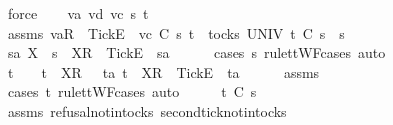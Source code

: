 \begin{isabellebody}
\ force\isanewline
{}\isamarkupfalse%
\isanewline
\ \ \isamarkupfalse%
\ va\ vd\ vc\ s{}{\isacharprime}\ t\isanewline
\ \ \isamarkupfalse%
\ assms{\isacharcolon}\ {\isachardoublequoteopen}{\isacharbrackleft}va{\isacharbrackright}\isactrlsub R\ {\isacharhash}\ {\isacharbrackleft}Tick{\isacharbrackright}\isactrlsub E\ {\isacharhash}\ vc\ {\isasymsubseteq}\isactrlsub C\ s{}{\isacharprime}{\isachardoublequoteclose}\ {\isachardoublequoteopen}t\ {\isasymin}\ tocks\ UNIV{\isachardoublequoteclose}\ {\isachardoublequoteopen}t\ {\isasymle}\isactrlsub C\ s{}{\isacharprime}\ {\isacharat}\ s{}{\isachardoublequoteclose}\isanewline
\ \ \isamarkupfalse%
\ \isamarkupfalse%
\ s{}{\isacharprime}a\ X\ \ {\isachardoublequoteopen}s{}{\isacharprime}\ {\isacharequal}\ {\isacharbrackleft}X{\isacharbrackright}\isactrlsub R\ {\isacharhash}\ {\isacharbrackleft}Tick{\isacharbrackright}\isactrlsub E\ {\isacharhash}\ s{}{\isacharprime}a{\isachardoublequoteclose}\isanewline
\ \ \ \ \isamarkupfalse%
\ {\isacharparenleft}cases\ s{}{\isacharprime}\ rule{\isacharcolon}ttWF{\isachardot}cases{\isacharcomma}\ auto{\isacharparenright}\isanewline
\ \ \isamarkupfalse%
\ \isamarkupfalse%
\ {\isachardoublequoteopen}t\ {\isacharequal}\ {\isacharbrackleft}{\isacharbrackright}\ {\isasymor}\ t\ {\isacharequal}\ {\isacharbrackleft}{\isacharbrackleft}X{\isacharbrackright}\isactrlsub R{\isacharbrackright}\ {\isasymor}\ {\isacharparenleft}{\isasymexists}\ ta{\isachardot}\ t\ {\isacharequal}\ {\isacharbrackleft}X{\isacharbrackright}\isactrlsub R\ {\isacharhash}\ {\isacharbrackleft}Tick{\isacharbrackright}\isactrlsub E\ {\isacharhash}\ ta{\isacharparenright}{\isachardoublequoteclose}\isanewline
\ \ \ \ \isamarkupfalse%
\ assms{\isacharparenleft}{}{\isacharparenright}\ \isamarkupfalse%
\ {\isacharparenleft}cases\ t\ rule{\isacharcolon}ttWF{\isachardot}cases{\isacharcomma}\ auto{\isacharparenright}\isanewline
\ \ \isamarkupfalse%
\ \isamarkupfalse%
\ {\isachardoublequoteopen}t\ {\isasymle}\isactrlsub C\ s{}{\isacharprime}{\isachardoublequoteclose}\isanewline
\ \ \ \ \isamarkupfalse%
\ assms{\isacharparenleft}{}{\isacharparenright}\ refusal{\isacharunderscore}notin{\isacharunderscore}tocks\ second{\isacharunderscore}tick{\isacharunderscore}notin{\isacharunderscore}tocks\ \isamarkupfalse%

\end{isabellebody}
